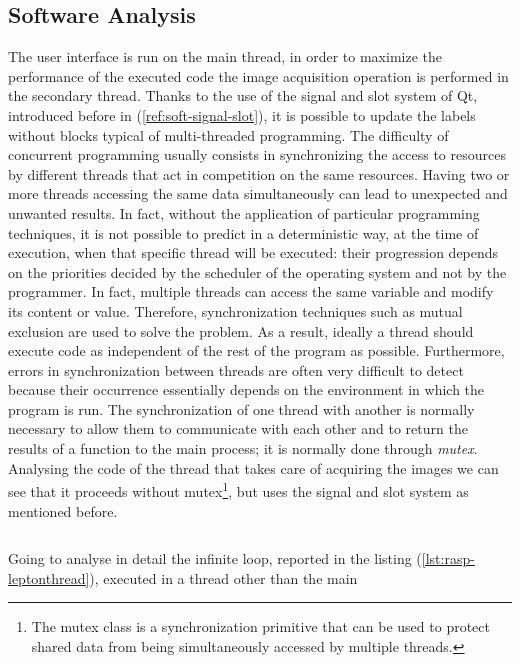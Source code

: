 \subsection{Software Analysis}
\label{ssec:raspberry-softw-analysis}
The user interface is run on the main thread, in order to maximize the
performance of the executed code the image acquisition operation is performed in
the secondary thread. Thanks to the use of the signal and slot system of Qt, 
introduced before in (\ref{ref:soft-signal-slot}), it is possible to update the 
labels without blocks typical of multi-threaded programming. 
The difficulty of concurrent programming usually consists in
synchronizing the access to resources by different threads that act in
competition on the same resources. Having two or more threads accessing the same
data simultaneously can lead to unexpected and unwanted results. 
In fact, without the application of particular programming techniques, it is not
possible to predict in a deterministic way, at the time of execution, when that
specific thread will be executed: their progression depends on the priorities
decided by the scheduler of the operating system and not by the programmer. 
In fact, multiple threads can access the same variable and modify its content or
value. Therefore, synchronization techniques such as mutual exclusion are used
to solve the problem. As a result, ideally a thread should execute code as
independent of the rest of the program as possible. Furthermore, errors in
synchronization between threads are often very difficult to detect because their
occurrence essentially depends on the environment in which the program is run.
The synchronization of one thread with another is normally necessary to allow
them to communicate with each other and to return the results of a function to
the main process; it is normally done through \emph{mutex}\cite{wiki:thread}.
Analysing the code of the thread that takes care of acquiring the images we can 
see that it proceeds without mutex\footnote{The mutex class is a synchronization
primitive that can be used to protect shared data from being simultaneously
accessed by multiple threads.}, but uses the signal and slot system as mentioned
before.
%
\inputminted[frame=lines,framesep=2mm, linenos=true, autogobble, breaklines=true, fontsize=\scriptsize, firstline=36, lastline=100]{c++}{software/code/leptonthread.cpp} 
%
\pagebreak
Going to analyse in detail the infinite loop, reported in the
listing (\ref{lst:rasp-leptonthread}), executed in a thread other than the main
